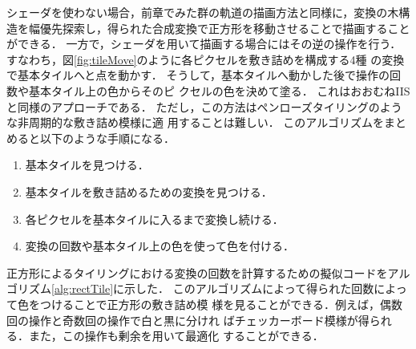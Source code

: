 シェーダを使わない場合，前章でみた群の軌道の描画方法と同様に，変換の木構
造を幅優先探索し，得られた合成変換で正方形を移動させることで描画すること
ができる．
一方で，シェーダを用いて描画する場合にはその逆の操作を行う．
すなわち，図\ref{fig:tileMove}のように各ピクセルを敷き詰めを構成する4種
の変換で基本タイルへと点を動かす．
そうして，基本タイルへ動かした後で操作の回数や基本タイル上の色からそのピ
クセルの色を決めて塗る．
これはおおむねIISと同様のアプローチである．
ただし，この方法はペンローズタイリングのような非周期的な敷き詰め模様に適
用することは難しい．
このアルゴリズムをまとめると以下のような手順になる．
\begin{enumerate}
 \item 基本タイルを見つける．
 \item 基本タイルを敷き詰めるための変換を見つける．
 \item 各ピクセルを基本タイルに入るまで変換し続ける．
 \item 変換の回数や基本タイル上の色を使って色を付ける．
\end{enumerate}

正方形によるタイリングにおける変換の回数を計算するための擬似コードをアル
ゴリズム\ref{alg:rectTile}に示した．
このアルゴリズムによって得られた回数によって色をつけることで正方形の敷き詰め模
様を見ることができる．例えば，偶数回の操作と奇数回の操作で白と黒に分けれ
ばチェッカーボード模様が得られる．また，この操作も剰余を用いて最適化
することができる．

